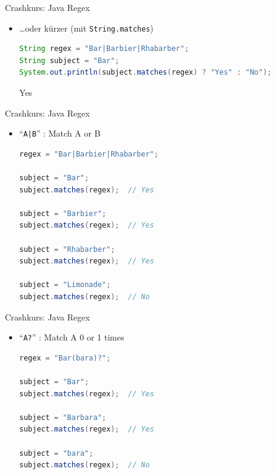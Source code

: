 \documentclass[18pt]{beamer}
\newcommand{\quotes}[1]{``#1''}
\begin{document}
\begin{frame}[fragile]{Crashkurs: Java Regex}
    \begin{itemize}
        \item \dots oder kürzer (mit \texttt{String.matches})

        \begin{lstlisting}[language=Java,basicstyle=\scriptsize]
String regex = "Bar|Barbier|Rhabarber";
String subject = "Bar";
System.out.println(subject.matches(regex) ? "Yes" : "No");
        \end{lstlisting}

        \begin{exampleblock}{}
Yes
        \end{exampleblock}

    \end{itemize}
\end{frame}

\begin{frame}[fragile]{Crashkurs: Java Regex}
    \begin{itemize}
        \item \Large{\quotes{\alert{\texttt{A|B}}}} : Match A or B

        \vspace{.2in}

        \begin{lstlisting}[language=Java,basicstyle=\scriptsize]
regex = "Bar|Barbier|Rhabarber";

subject = "Bar";
subject.matches(regex);  // Yes

subject = "Barbier";
subject.matches(regex);  // Yes

subject = "Rhabarber";
subject.matches(regex);  // Yes

subject = "Limonade";
subject.matches(regex);  // No
        \end{lstlisting}

    \end{itemize}
\end{frame}

\begin{frame}[fragile]{Crashkurs: Java Regex}
    \begin{itemize}
        \item \Large{\quotes{\alert{\texttt{A?}}}} : Match A 0 or 1 times

        \vspace{.2in}

        \begin{lstlisting}[language=Java,basicstyle=\scriptsize]
regex = "Bar(bara)?";

subject = "Bar";
subject.matches(regex);  // Yes

subject = "Barbara";
subject.matches(regex);  // Yes

subject = "bara";
subject.matches(regex);  // No
        \end{lstlisting}

    \end{itemize}
\end{frame}
\end{document}
